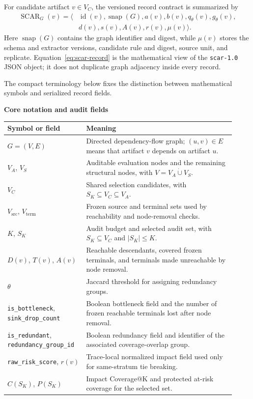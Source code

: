 \documentclass[pdflatex,sn-basic]{sn-jnl}
\begin{document}
For candidate artifact $v\in V_C$, the versioned record contract is summarized by
\begin{equation}
\begin{aligned}
\operatorname{SCAR}_{G}(v)=\big\langle
&\operatorname{id}(v),\operatorname{snap}(G),a(v),b(v),q_{\theta}(v),g_{\theta}(v),\\
&d(v),s(v),A(v),r(v),\mu(v)\big\rangle .
\end{aligned}
\label{eq:scar-record}
\end{equation}
Here $\operatorname{snap}(G)$ contains the graph identifier and digest, while $\mu(v)$ stores the schema and extractor versions, candidate rule and digest, source unit, and replicate. Equation~\ref{eq:scar-record} is the mathematical view of the \texttt{scar-1.0} JSON object; it does not duplicate graph adjacency inside every record.

The compact terminology below fixes the distinction between mathematical symbols and serialized record fields.

\begin{center}
{\small
\textbf{Core notation and audit fields}\\[3pt]
\renewcommand{\arraystretch}{1.08}
\begin{tabular}{Z{0.31\linewidth}Z{0.61\linewidth}}
\toprule
\textbf{Symbol or field} & \textbf{Meaning} \\
\midrule
$G=(V,E)$ & Directed dependency-flow graph; $(u,v)\in E$ means that artifact $v$ depends on artifact $u$. \\
$V_A$, $V_S$ & Auditable evaluation nodes and the remaining structural nodes, with $V=V_A\mathbin{\dot\cup}V_S$. \\
$V_C$ & Shared selection candidates, with $S_K\subseteq V_C\subseteq V_A$. \\
$V_{\mathrm{src}}$, $V_{\mathrm{term}}$ & Frozen source and terminal sets used by reachability and node-removal checks. \\
$K$, $S_K$ & Audit budget and selected audit set, with $S_K\subseteq V_C$ and $|S_K|\le K$. \\
$D(v)$, $T(v)$, $A(v)$ & Reachable descendants, covered frozen terminals, and terminals made unreachable by node removal. \\
$\theta$ & Jaccard threshold for assigning redundancy groups. \\
\texttt{is\_bottleneck}, \texttt{sink\_drop\_count} & Boolean bottleneck field and the number of frozen reachable terminals lost after node removal. \\
\texttt{is\_redundant}, \texttt{redundancy\_group\_id} & Boolean redundancy field and identifier of the associated coverage-overlap group. \\
\texttt{raw\_risk\_score}, $r(v)$ & Trace-local normalized impact field used only for same-stratum tie breaking. \\
$C(S_K)$, $P(S_K)$ & Impact Coverage@K and protected at-risk coverage for the selected set. \\
\bottomrule
\end{tabular}}
\end{center}
\end{document}
